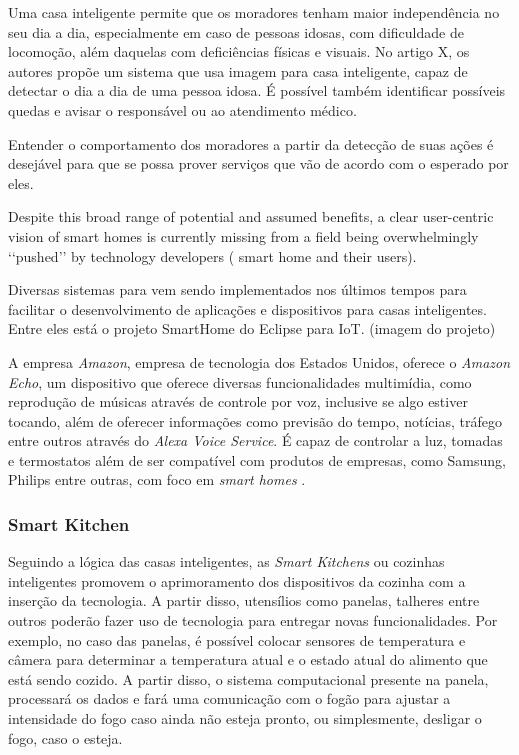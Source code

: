 Uma casa inteligente permite que os moradores tenham maior independência no seu dia a dia, especialmente em caso de pessoas idosas, com dificuldade de locomoção, além daquelas com deficiências físicas e visuais.
No artigo X, os autores propõe um sistema que usa imagem para casa inteligente, capaz de detectar o dia a dia de uma pessoa idosa. É possível também identificar possíveis quedas e avisar o responsável ou ao atendimento médico.

Entender o comportamento dos moradores a partir da detecção de suas ações é desejável para que se possa prover serviços que vão de acordo com o esperado por eles.


Despite this broad range of potential and assumed benefits, a clear user-centric vision of smart homes is currently missing from a field being overwhelmingly ‘‘pushed’’ by technology developers ( smart home and their users).


Diversas sistemas para vem sendo implementados nos últimos tempos para facilitar o desenvolvimento de aplicações e dispositivos para casas inteligentes.
Entre eles está o projeto SmartHome do Eclipse para IoT.
(imagem do projeto)
    

A empresa \textit{Amazon}, empresa de tecnologia dos Estados Unidos, oferece o \textit{Amazon Echo}, um dispositivo que oferece diversas funcionalidades multimídia, como reprodução de músicas através de controle por voz, inclusive se algo estiver tocando, além de oferecer informações como previsão 
do tempo, notícias, tráfego entre outros através do \textit{Alexa Voice Service}. É capaz de controlar a luz, tomadas e termostatos além de ser compatível com produtos de empresas, como Samsung, Philips entre outras, com foco em \textit{smart homes} \cite{amazon2017}.

\subsubsection{Smart Kitchen}

Seguindo a lógica das casas inteligentes, as \textit{Smart Kitchens} ou cozinhas inteligentes promovem o aprimoramento dos dispositivos da cozinha com a inserção da tecnologia. A partir disso, utensílios como panelas, talheres entre outros poderão fazer uso de tecnologia para entregar novas funcionalidades. Por exemplo, no caso das panelas, é possível colocar sensores de temperatura e câmera para determinar a temperatura atual e o estado atual do alimento que está sendo cozido. A partir disso, o sistema computacional presente na panela, processará os dados e fará uma comunicação com o fogão para ajustar a intensidade do fogo caso ainda não esteja pronto, ou simplesmente, desligar o fogo, caso o esteja. 

